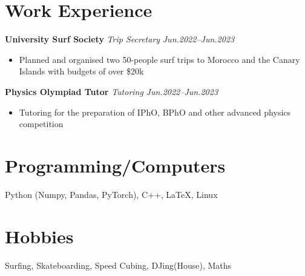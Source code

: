 \documentclass[11pt,a4paper,roman]{moderncv}        %
\begin{document}
\section{Work Experience}

\textbf{University Surf Society} \textit{Trip Secretary} \hfill \textit{Jun.2022--Jun.2023}
\begin{itemize}
	\item Planned and organised two 50-people surf trips to Morocco and the Canary Islands with budgets of over \$20k
\end{itemize}
\vspace*{1mm}

\textbf{Physics Olympiad Tutor} \textit{Tutoring} \hfill \textit{Jun.2022--Jun.2023}
\begin{itemize}
	\item Tutoring for the preparation of IPhO, BPhO and other advanced physics competition
\end{itemize}
\section{Programming/Computers}
 {Python (Numpy, Pandas, PyTorch), C++, \LaTeX, Linux}

\section{Hobbies}
 {Surfing, Skateboarding, Speed Cubing, DJing(House), Maths}
\end{document}

